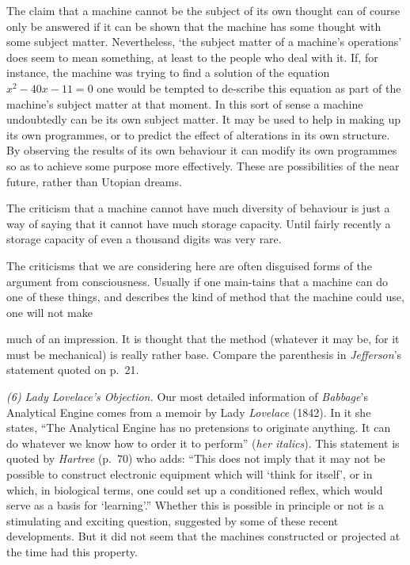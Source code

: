 \documentclass[10pt]{article} %
\begin{document}
The claim that a machine cannot be the subject of its own thought can of course only be answered if it can be shown that the machine has some thought with some subject matter. Nevertheless, `the subject matter of a machine's operations' does seem to mean something, at least to the people who deal with it. If, for instance, the machine was trying to find a solution of the equation $x^2 - 40x - 11 = 0$ one would be tempted to de-scribe this equation as part of the machine's subject matter at that moment. In this sort of sense a machine undoubtedly can be its own subject matter. It may be used to help in making up its own programmes, or to predict the effect of alterations in its own structure. By observing the results of its own behaviour it can modify its own programmes so as to achieve some purpose more effectively. These are possibilities of the near future, rather than Utopian dreams.

The criticism that a machine cannot have much diversity of behaviour is just a way of saying that it cannot have much storage capacity. Until fairly recently a storage capacity of even a thousand digits was very rare.

The criticisms that we are considering here are often disguised forms of the argument from consciousness. Usually if one main-tains that a machine can do one of these things, and describes the kind of method that the machine could use, one will not make

much of an impression. It is thought that the method (whatever it may be, for it must be mechanical) is really rather base. Compare the parenthesis in \textit{Jefferson}'s statement quoted on p.~21.

\vspace{0.5\baselineskip} %
\noindent\normalfont \textit{(6) Lady Lovelace's Objection.} Our most detailed information of \textit{Babbage}'s Analytical Engine comes from a memoir by Lady \textit{Lovelace} (1842). In it she states, ``The Analytical Engine has no pretensions to originate anything. It can do whatever we know how to order it to perform'' (\textit{her italics}). This statement is quoted by \textit{Hartree} (p.~70) who adds: ``This does not imply that it may not be possible to construct electronic equipment which will `think for itself', or in which, in biological terms, one could set up a conditioned reflex, which would serve as a basis for `learning'.'' Whether this is possible in principle or not is a stimulating and exciting question, suggested by some of these recent developments. But it did not seem that the machines constructed or projected at the time had this property.
\end{document}
